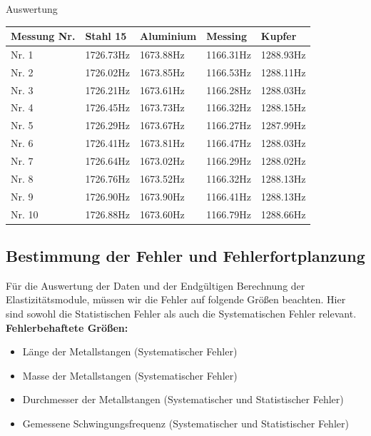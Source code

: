 \documentclass[twoside]{protokoll}
\begin{document}
\begin{aufgabe}{Auswertung}
 \begin{table}[H]
        \centering
        \begin{tabularx}{1.00\textwidth}{X X X X X} %
            \toprule
            \textbf{Messung Nr.} & \textbf{Stahl 15} & \textbf{Aluminium} & \textbf{Messing} & \textbf{Kupfer} \\
            \midrule
                Nr. 1 & 1726.73Hz & 1673.88Hz & 1166.31Hz & 1288.93Hz \\
                Nr. 2 & 1726.02Hz & 1673.85Hz & 1166.53Hz & 1288.11Hz \\
                Nr. 3 & 1726.21Hz & 1673.61Hz & 1166.28Hz & 1288.03Hz \\
                Nr. 4 & 1726.45Hz & 1673.73Hz & 1166.32Hz & 1288.15Hz \\
                Nr. 5 & 1726.29Hz & 1673.67Hz & 1166.27Hz & 1287.99Hz \\
                Nr. 6 & 1726.41Hz & 1673.81Hz & 1166.47Hz & 1288.03Hz \\
                Nr. 7 & 1726.64Hz & 1673.02Hz & 1166.29Hz & 1288.02Hz \\
                Nr. 8 & 1726.76Hz & 1673.52Hz & 1166.32Hz & 1288.13Hz \\
                Nr. 9 & 1726.90Hz & 1673.90Hz & 1166.41Hz & 1288.13Hz \\
                Nr. 10& 1726.88Hz & 1673.60Hz & 1166.79Hz & 1288.66Hz \\
            \bottomrule
        \end{tabularx}
        \label{tab:mytable}
    \end{table}

\subsection{Bestimmung der Fehler und Fehlerfortplanzung}

Für die Auswertung der Daten und der Endgültigen Berechnung der Elastizitätsmodule, müssen wir die Fehler 
auf folgende Größen beachten. 
Hier sind sowohl die Statistischen Fehler als auch die Systematischen Fehler relevant.\\


\textbf{Fehlerbehaftete Größen:}
\begin{itemize}
\item Länge der Metallstangen (Systematischer Fehler)
\item Masse der Metallstangen (Systematischer Fehler)
\item Durchmesser der Metallstangen (Systematischer und Statistischer Fehler)
\item Gemessene Schwingungsfrequenz (Systematischer und Statistischer Fehler)
\end{itemize}


\end{aufgabe}
\end{document}
